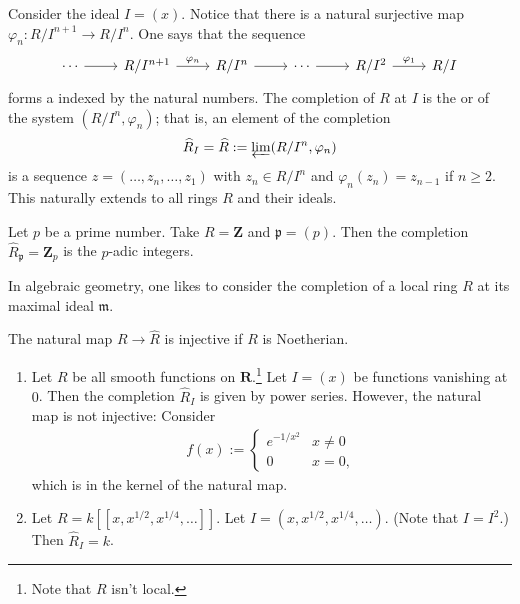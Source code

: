 \documentclass[11pt, oneside,margin=1in]{article}
\begin{document}
Consider the ideal $I=(x)$. Notice that there is a natural surjective map $\varphi_n :R/I^{n+1} \longrightarrow R/I^{n}$. One says that the sequence
\[
\begin{tikzcd}
	\cdots\ar[r] &R/I^{n+1}\ar[r,"\varphi_n"]&R/I^n \ar[r] &\cdots\ar[r] &R/I^2 \ar[r,"\varphi_1"] &R/I 
\end{tikzcd}
\]
forms a  indexed by the natural numbers.
The completion of $R$ at $I$ is the  or  of the system $(R/I^n, \varphi_n)$; that is, an element of the completion
\begin{align*}
	\widehat{R}_I = \widehat{R} := \varprojlim (R/I^n, \varphi_n)
\end{align*}
is a sequence $z=(\hdots, z_n,\hdots,z_1)$ with $z_n\in R/I^n$ and $\varphi_n (z_n)=z_{n-1}$ if $n\ge 2$. This naturally extends to all rings $R$ and their ideals.

\begin{example}[ ]\label{}\text{}
Let $p$ be a prime number. Take $R=\mathbf{Z}$ and $\mathfrak{p}=(p)$. Then the completion $\widehat{R}_\mathfrak{p} = \mathbf{Z}_p$ is the $p$-adic integers.
\end{example}

In algebraic geometry, one likes to consider the completion of a local ring $R$ at its maximal ideal $\mathfrak{m}$.

The natural map $R\longrightarrow \widehat{R}$ is injective if $R$ is Noetherian.

\begin{example}\label{}\text{}
\begin{enumerate}
	\item Let $R$ be all smooth functions on $\mathbf{R}$.\footnote{Note that $R$ isn't local.} Let $I=(x)$ be functions vanishing at $0$. Then the completion $\widehat{R}_I$ is given by power series. However, the natural map is not injective: Consider
		\begin{align*}
			f(x):=
			 \begin{cases}
				 e^{-1/x^2}&x\ne 0\\
				 0&x=0,
			\end{cases}
		\end{align*}
		which is in the kernel of the natural map.
	\item Let $R = k [\![x,x^{1/2},x^{1/4},\hdots]\!]$. Let $I=(x,x^{1/2}, x^{1/4},\hdots)$. (Note that $I=I^2$.) Then $\widehat{R}_I = k$.
\end{enumerate}
\end{example}
\end{document}
